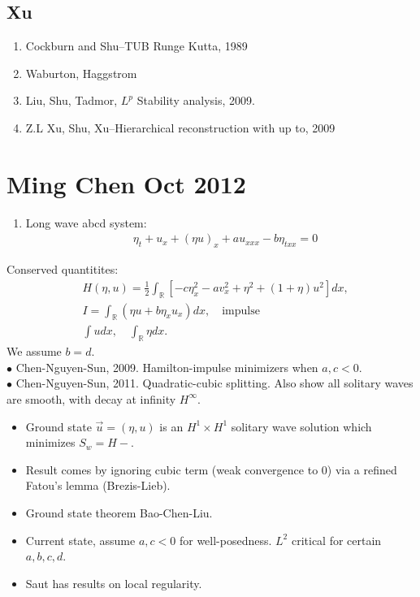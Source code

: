 \documentclass[12pt,reqno]{amsart}
\numberwithin{equation}{section}  %
\newcommand{\rr}{\mathbb{R}}
\begin{document}
  \subsection{Xu} 
  \begin{enumerate}
    \item{}
      Cockburn and Shu--TUB Runge Kutta, 1989
    \item{}
      Waburton, Haggstrom
    \item{}
      Liu, Shu, Tadmor, $L^{p}$ Stability analysis, 2009.
    \item{}
      Z.L Xu, Shu, Xu--Hierarchical reconstruction with up to, 2009
  \end{enumerate}
  \section{Ming Chen Oct 2012}
  \begin{enumerate}
    \item{}
      Long wave abcd system:
      \begin{equation*}
	\begin{split}
	  & \eta_{t} + u_{x} + (\eta u)_{x} + au_{xxx} - b\eta_{txx} =0
	\end{split}
      \end{equation*}
  \end{enumerate}
  Conserved quantitites:
  \begin{equation*}
    \begin{split}
      & H(\eta, u) = \frac{1}{2} \int_{\rr}[-c \eta_{x}^{2} - av_{x}^{2} + \eta^{2} + (1 + \eta)u^{2}] dx,
      \\
      & I = \int_{\rr} (\eta u + b \eta_{x} u_{x}) dx, \quad \text{impulse}
      \\
      & \int u dx, \quad \int_{\rr} \eta dx.
    \end{split}
  \end{equation*}
  We assume $b = d$.
  \\
  $\bullet$ Chen-Nguyen-Sun, 2009. Hamilton-impulse minimizers when $a,c<0$.
  \\
  $\bullet$ Chen-Nguyen-Sun, 2011. Quadratic-cubic splitting. Also show all solitary waves are smooth, with decay at infinity $H^{\infty}$.
  \begin{itemize}
    \item
      Ground state $\vec{u} = (\eta, u)$  is an $H^{1} \times H^{1}$ solitary wave solution which minimizes $S_{w} = H - $.
    \item
      Result comes by ignoring cubic term (weak convergence to 0) via a refined Fatou's lemma (Brezis-Lieb).
    \item Ground state theorem Bao-Chen-Liu.
    \item{}
      Current state, assume $a, c < 0$ for well-posedness. $L^{2}$ critical for certain $a,b,c,d$.
    \item{}
      Saut has results on local regularity.
  \end{itemize}
\end{document}
